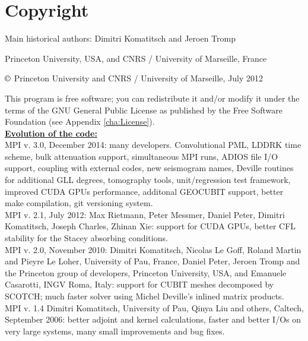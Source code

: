 

\chapter*{Copyright}

Main historical authors: Dimitri Komatitsch and Jeroen Tromp

Princeton University, USA, and CNRS / University of Marseille, France

$\copyright$ Princeton University and CNRS / University of Marseille, July 2012

This program is free software; you can redistribute it and/or modify
it under the terms of the GNU General Public License as published
by the Free Software Foundation (see Appendix \ref{cha:License}).\\


\textbf{\underline{Evolution of the code:}}\\

MPI v. 3.0, December 2014: many developers.
Convolutional PML, LDDRK time scheme, bulk attenuation support, simultaneous MPI runs,
ADIOS file I/O support, coupling with external codes, new seismogram names,
Deville routines for additional GLL degrees, tomography tools, unit/regression test framework,
improved CUDA GPUs performance, additonal GEOCUBIT support, better make compilation,
git versioning system. \\


MPI v. 2.1, July 2012: Max Rietmann, Peter Messmer, Daniel Peter, Dimitri
Komatitsch, Joseph Charles, Zhinan Xie: support for CUDA GPUs, better
CFL stability for the Stacey absorbing conditions. \\


MPI v. 2.0, November 2010: Dimitri Komatitsch, Nicolas Le Goff, Roland
Martin and Pieyre Le Loher, University of Pau, France, Daniel Peter,
Jeroen Tromp and the Princeton group of developers, Princeton University,
USA, and Emanuele Casarotti, INGV Roma, Italy: support for CUBIT meshes
decomposed by SCOTCH; much faster solver using Michel Deville's inlined
matrix products.\\


MPI v. 1.4 Dimitri Komatitsch, University of Pau, Qinya Liu and others,
Caltech, September 2006: better adjoint and kernel calculations, faster
and better I/Os on very large systems, many small improvements and
bug fixes.\\


